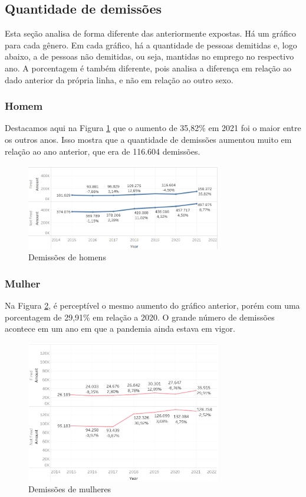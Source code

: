 \subsection{Quantidade de demissões}

Esta seção analisa de forma diferente das anteriormente expostas. Há um gráfico para cada gênero. Em cada gráfico, há a quantidade de pessoas demitidas e, logo abaixo, a de pessoas não demitidas, ou seja, mantidas no emprego no respectivo ano. A porcentagem é também diferente, pois analisa a diferença em relação ao dado anterior da própria linha, e não em relação ao outro sexo.

\subsubsection{Homem}

Destacamos aqui na Figura \ref{fig_4_qnt_h_demit} que o aumento de 35,82\% em 2021 foi o maior entre os outros anos. Isso mostra que a quantidade de demissões aumentou muito em relação ao ano anterior, que era de 116.604 demissões. 

\begin{figure}[htbp]
	\centerline{
		\includegraphics[width=85mm]{assets/4_qnt_h_demit.PNG}
	}
	\caption{Demissões de homens}
	\label{fig_4_qnt_h_demit}
\end{figure}

\subsubsection{Mulher}

Na Figura \ref{fig_4_qnt_m_demit}, é perceptível o mesmo aumento do gráfico anterior, porém com uma porcentagem de 29,91\% em relação a 2020. O grande número de demissões acontece em um ano em que a pandemia ainda estava em vigor. 

\begin{figure}[htbp]
	\centerline{
		\includegraphics[width=85mm]{assets/4_qnt_m_demit.PNG}
	}
	\caption{Demissões de mulheres}
	\label{fig_4_qnt_m_demit}
\end{figure}

